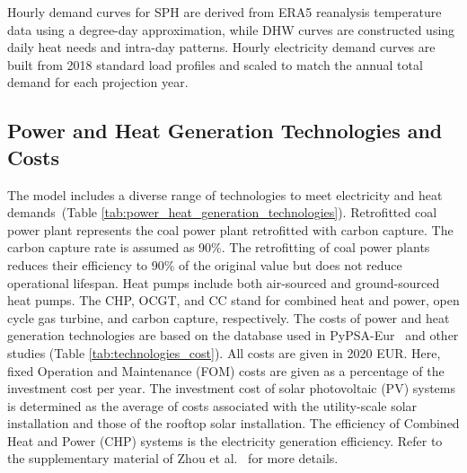 \documentclass[preprint,12pt]{elsarticle}
\begin{document}
Hourly demand curves for SPH are derived from ERA5 reanalysis temperature data using a degree-day approximation, while DHW curves are constructed using daily heat needs and intra-day patterns. Hourly electricity demand curves are built from 2018 standard load profiles and scaled to match the annual total demand for each projection year.

\subsection{Power and Heat Generation Technologies and Costs}\label{sec:power_heat_generation_technologies_and_costs}
The model includes a diverse range of technologies to meet electricity and heat demands~(Table \ref{tab:power_heat_generation_technologies}). Retrofitted coal power plant represents the coal power plant retrofitted with
carbon capture. The carbon capture rate is assumed as 90\%. The retrofitting of coal power plants reduces their efficiency to 90\% of the original value but does not reduce operational lifespan. Heat pumps include
both air-sourced and ground-sourced heat pumps. The CHP, OCGT, and CC stand for
combined heat and power, open cycle gas turbine, and carbon capture, respectively. The costs of power and heat generation technologies are based on the database used in PyPSA-Eur~\citep{PyPSAEur} and other studies (Table \ref{tab:technologies_cost}). All costs are given in 2020 EUR. Here, fixed Operation and Maintenance (FOM) costs are given as a percentage of the investment cost per year. The investment cost of solar photovoltaic (PV) systems is determined as the average of costs associated with the utility-scale solar installation and those of the rooftop solar installation. The efficiency of Combined Heat and Power (CHP) systems is the electricity generation efficiency. Refer to the supplementary material of Zhou et al.~\citep{zhou_multienergy_2024} for more details. 
\end{document}
